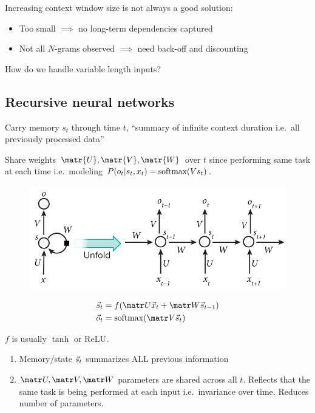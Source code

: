 
Increasing context window size is not always a good solution:
\begin{itemize}
    \item Too small $\implies$ no long-term dependencies captured
    \item Not all $N$-grams observed $\implies$ need back-off and discounting
\end{itemize}

How do we handle variable length inputs?

\subsection{Recursive neural networks}


Carry memory $s_t$ through time $t$, ``summary of infinite context duration
i.e.\ all previously processed data''

Share weights $\matr{U}, \matr{V}, \matr{W}$ over $t$ since performing same
task at each time i.e.\ modeling $P(o_t | s_t, x_t) = \operatorname*{softmax}(V s_t)$.

\begin{figure}[htpb]
    \centering
    \includegraphics[width=0.8\linewidth]{Figures/rnn.jpg}
    \caption{}
\end{figure}

\begin{align}
    \s_t &= f(\U \x_t + \W \s_{t-1}) \\
    \o_t &= \softmax( \V \s_t)
\end{align}

$f$ is usually $\tanh$ or ReLU.

\begin{enumerate}
    \item Memory/state $\vec{s}_t$ summarizes ALL previous information
    \item $\U, \V, \W$ parameters are shared across all $t$. Reflects
        that the same task is being performed at each input i.e.\
        invariance over time. Reduces number of parameters.
\end{enumerate}


